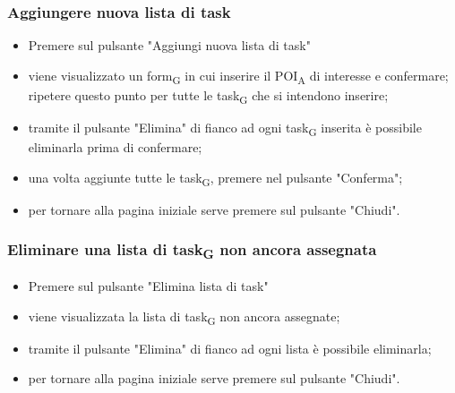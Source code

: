 \subsubsection{Aggiungere nuova lista di task}
\begin{itemize}
    \item Premere sul pulsante "Aggiungi nuova lista di task"
    \item viene visualizzato un form\textsubscript{G} in cui inserire il POI\textsubscript{A} di interesse e confermare; ripetere questo punto per tutte le task\textsubscript{G} che si intendono inserire;
    \item tramite il pulsante "Elimina" di fianco ad ogni task\textsubscript{G} inserita è possibile eliminarla prima di confermare;
    \item una volta aggiunte tutte le task\textsubscript{G}, premere nel pulsante "Conferma";
    \item per tornare alla pagina iniziale serve premere sul pulsante "Chiudi".
\end{itemize}
\subsubsection{Eliminare una lista di task\textsubscript{G} non ancora assegnata}
\begin{itemize}
    \item Premere sul pulsante "Elimina lista di task"
    \item viene visualizzata la lista di task\textsubscript{G} non ancora assegnate;
    \item tramite il pulsante "Elimina" di fianco ad ogni lista è possibile eliminarla;
    \item per tornare alla pagina iniziale serve premere sul pulsante "Chiudi".
\end{itemize}